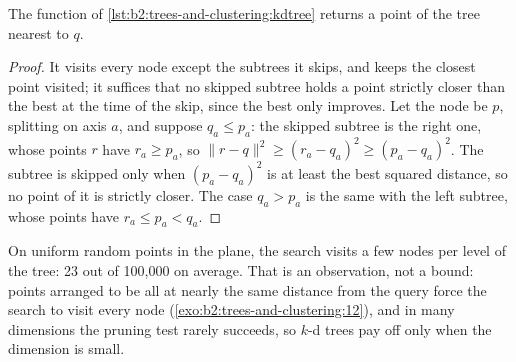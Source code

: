 \label{lst:b2:trees-and-clustering:kdtree}

\begin{omfigure}
\par{}
\end{omfigure}

\begin{proposition}\label{prop:b2:trees-and-clustering:kd-correct}
The function  of \cref{lst:b2:trees-and-clustering:kdtree} returns a point of the tree nearest to $q$.
\end{proposition}

\begin{proof}
It visits every node except the subtrees it skips, and keeps the closest point visited; it suffices that no skipped
subtree holds a point strictly closer than the best at the time of the skip, since the best only improves. Let the node
be $p$, splitting on axis $a$, and suppose $q_a \leq p_a$: the skipped subtree is the right one, whose points $r$ have
$r_a \geq p_a$, so $\lVert r - q \rVert^2 \geq (r_a - q_a)^2 \geq (p_a - q_a)^2$. The subtree is skipped only when $(p_a
- q_a)^2$ is at least the best squared distance, so no point of it is strictly closer. The case $q_a > p_a$ is the same
with the left subtree, whose points have $r_a \leq p_a < q_a$.
\end{proof}

\label{out:b2:trees-and-clustering:kdtree}

On uniform random points in the plane, the search visits a few nodes per level of the tree: 23 out of 100,000 on
average. That is an observation, not a bound: points arranged to be all at nearly the same distance from the query force
the search to visit every node (\cref{exo:b2:trees-and-clustering:12}), and in many dimensions the pruning test rarely
succeeds, so $k$-d trees pay off only when the dimension is small.

